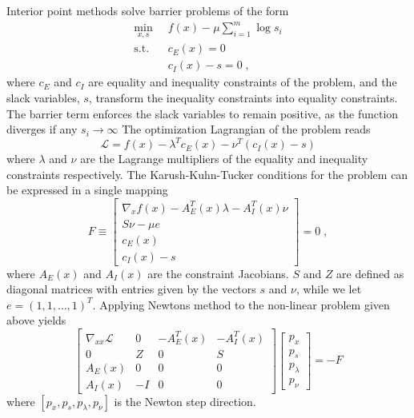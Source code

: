 Interior point methods solve barrier problems of the form
 \begin{align*}
	\min_{x , s} \; & \; f(x) - \mu \sum_{i=1}^{m} \log s_i \\
	\text{s.t.}  \; & \; c_E (x) = 0  \\ 
					& \; c_I (x) - s =0 \; ,
\end{align*}
where $c_E$ and $c_I$ are equality and inequality constraints of the problem, and the slack variables, $s$, transform the inequality constraints into equality constraints. The barrier term enforces the slack variables to remain positive, as the function diverges if any $s_i \to \infty$
The optimization Lagrangian of the problem reads
\begin{equation}
	\mathcal{L} = f(x) - \lambda ^T c_E (x) - \nu ^T (c_I (x) -s)
\end{equation}
where $\lambda$ and $\nu$ are the Lagrange multipliers of the equality and inequality constraints respectively. 
The Karush-Kuhn-Tucker conditions for the problem can be expressed in a single mapping
\begin{equation}
	F \equiv 
	\begin{bmatrix}
  \nabla_x f(x) - A_{E}^{T}(x) \lambda  - A_{I}^{T}(x) \nu \\
  S \nu - \mu e \\
  c_{E} (x)		\\
  c_{I} (x) - s 
  \end{bmatrix}
  = 0 \; ,
\end{equation}
where $A_E (x)$ and $A_I (x)$ are the constraint Jacobians. $S$ and $Z$ are defined as diagonal matrices with entries given by the vectors $s$ and $\nu$, while we let $e = (1 ,1 , \ldots , 1 )^T$.
Applying Newtons method to the non-linear problem given above yields
\begin{equation}
  \begin{bmatrix}
  \nabla_{xx} \mathcal{L} 	& 0 	& -A_{E}^{T}(x)	& -A_{I}^{T}(x)	\\
  0 						& Z 	& 0 			& S 			\\
  A_{E}(x) 					& 0 	& 0 			& 0				\\
  A_{I}(x) 					& -I	& 0				& 0				 
  \end{bmatrix}  
  \begin{bmatrix}
  p_x \\ p_s \\ p_{\lambda} \\ p_{\nu} 
  \end{bmatrix}
  = - F
\end{equation}
where $\left[ p_x , p_s , p_{\lambda} , p_{\nu} \right]$ is the Newton step direction.

